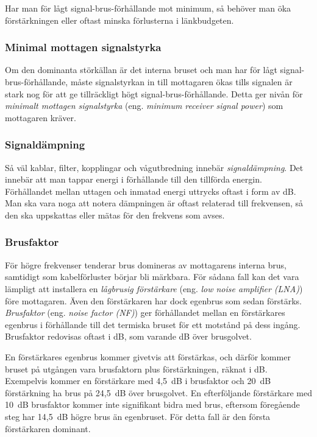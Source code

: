 Har man för lågt signal-brus-förhållande mot minimum, så behöver man öka
förstärkningen eller oftast minska förlusterna i länkbudgeten.

\subsubsection{Minimal mottagen signalstyrka}

Om den dominanta störkällan är det interna bruset och man har för lågt
signal-brus-förhållande, måste signalstyrkan in till mottagaren ökas
tills signalen är stark nog för att ge tillräckligt högt
signal-brus-förhållande.
Detta ger nivån för \emph{minimalt mottagen signalstyrka} (eng.
\emph{minimum receiver signal power}) som mottagaren kräver.

\subsubsection{Signaldämpning}

Så väl kablar, filter, kopplingar och vågutbredning innebär
\emph{signaldämpning}.
Det innebär att man tappar energi i förhållande till den tillförda energin.
Förhållandet mellan uttagen och inmatad energi uttrycks oftast i form av dB.
Man ska vara noga att notera dämpningen är oftast relaterad till frekvensen,
så den ska uppskattas eller mätas för den frekvens som avses.

\subsubsection{Brusfaktor}
\label{brusfaktor}

För högre frekvenser tenderar brus domineras av mottagarens interna brus,
samtidigt som kabelförluster börjar bli märkbara.
För sådana fall kan det vara lämpligt att installera en
\emph{lågbrusig förstärkare} (eng. \emph{low noise amplifier (LNA)}) före
mottagaren.
Även den förstärkaren har dock egenbrus som sedan förstärks.
\emph{Brusfaktor} (eng. \emph{noise factor (NF)}) ger förhållandet mellan en
förstärkares egenbrus i förhållande till det termiska bruset för ett motstånd
på dess ingång.
Brusfaktor redovisas oftast i dB, som varande dB över brusgolvet.

En förstärkares egenbrus kommer givetvis att förstärkas, och därför kommer
bruset på utgången vara brusfaktorn plus förstärkningen, räknat i dB.
Exempelvis kommer en förstärkare med 4,5~dB i brusfaktor och 20~dB förstärkning
ha brus på 24,5~dB över brusgolvet.
En efterföljande förstärkare med 10~dB brusfaktor kommer inte signifikant
bidra med brus, eftersom föregående steg har 14,5~dB högre brus än egenbruset.
För detta fall är den första förstärkaren dominant.

